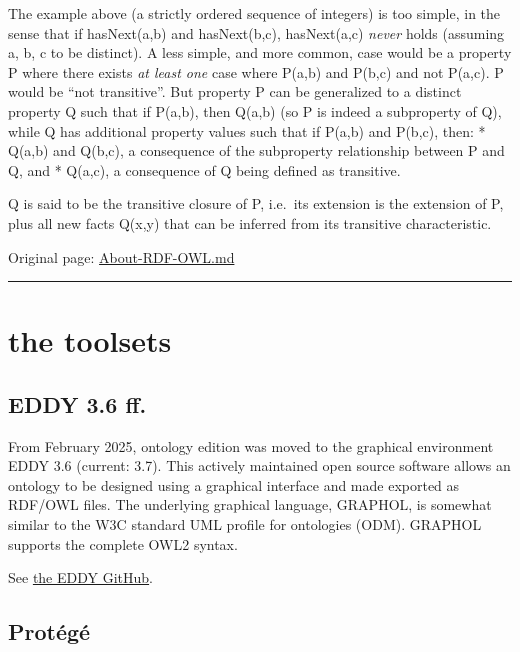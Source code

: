 \documentclass[
  11pt,
]{article}
\begin{document}
The example above (a strictly ordered sequence of integers) is too
simple, in the sense that if hasNext(a,b) and hasNext(b,c), hasNext(a,c)
\emph{never} holds (assuming a, b, c to be distinct). A less simple, and
more common, case would be a property P where there exists \emph{at
least one} case where P(a,b) and P(b,c) and not P(a,c). P would be ``not
transitive''. But property P can be generalized to a distinct property Q
such that if P(a,b), then Q(a,b) (so P is indeed a subproperty of Q),
while Q has additional property values such that if P(a,b) and P(b,c),
then: * Q(a,b) and Q(b,c), a consequence of the subproperty relationship
between P and Q, and * Q(a,c), a consequence of Q being defined as
transitive.

Q is said to be the transitive closure of P, i.e.~its extension is the
extension of P, plus all new facts Q(x,y) that can be inferred from its
transitive characteristic.

Original page:
\href{https://github.com/UICrail/CDM-RSM/wiki/About-RDF-OWL}{About-RDF-OWL.md}

\begin{center}\rule{0.5\linewidth}{0.5pt}\end{center}

\hypertarget{the-toolsets}{%
\section{the toolsets}\label{the-toolsets}}

\hypertarget{eddy-3.6-ff.}{%
\subsection{EDDY 3.6 ff.}\label{eddy-3.6-ff.}}

From February 2025, ontology edition was moved to the graphical
environment EDDY 3.6 (current: 3.7). This actively maintained open
source software allows an ontology to be designed using a graphical
interface and made exported as RDF/OWL files. The underlying graphical
language, GRAPHOL, is somewhat similar to the W3C standard UML profile
for ontologies (ODM). GRAPHOL supports the complete OWL2 syntax.

See \href{https://github.com/obdasystems/eddy}{the EDDY GitHub}.

\hypertarget{protuxe9guxe9}{%
\subsection{Protégé}\label{protuxe9guxe9}}
\end{document}
